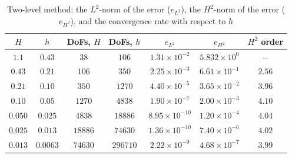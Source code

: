 \begin{table}
  \begin{center}
    \begin{tabular}{|c|c|c|c|c|c|c|}
    \hline
      $H$ &   $h$  &  DoFs, $ H $ & DoFs, $ h $ & $e_{L^2}$ & $e_{H^2}$ & $H^2$ order \\
      \hline
      $1.1$ & $0.43$ & $38$ & $106$ & $1.31\times 10^{-2}$ & $5.832\times
        10^0$ & $-$ \\
      $0.43$ & $0.21$ & $106$ & $350$ & $2.25\times 10^{-3}$ & $6.61\times
        10^{-1}$ & $2.56$ \\
      $0.21$ & $0.10$ & $350$ & $1270$ & $4.40\times 10^{-5}$ & $3.65\times
        10^{-2}$ & $3.96$ \\
      $0.10$ & $0.05$ & $1270$ & $4838$ & $1.90\times 10^{-7}$ & $2.00 \times
        10^{-3}$ & $4.10$ \\
      $0.050$ & $0.025$ & $4838$ & $18886$ & $8.95\times 10^{-10}$ & $1.20\times
        10^{-4}$ & $4.04$ \\
      $0.025$ & $0.013$ & $18886$ & $74630$ & $1.36\times 10^{-10}$ &
        $7.40\times 10^{-6}$ & $4.02$ \\
      $0.013$ & $0.0063$ & $74630$ & $296710$ & $2.22\times 10^{-9}$ &
        $4.68\times 10^{-7}$ & $3.99$ \\
    \hline
    \end{tabular}
  \end{center}
  \caption{Two-level method: the $L^2$-norm of the error ($e_{L^2}$), the
  $H^2$-norm of the error ($e_{H^2}$), and the convergence rate with respect to
  $h$}
  \label{tab:TwoLevelh}
\end{table}
